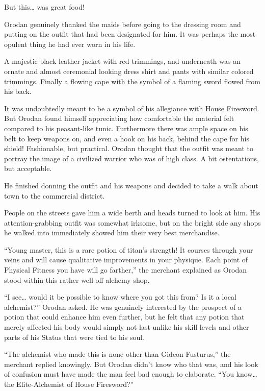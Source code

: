 \documentclass[a4paper,10pt]{book}
\begin{document}
But this… was great food!\par
Orodan genuinely thanked the maids before going to the dressing room and putting on the outfit that had been designated for him. It was perhaps the most opulent thing he had ever worn in his life.\par
A majestic black leather jacket with red trimmings, and underneath was an ornate and almost ceremonial looking dress shirt and pants with similar colored trimmings. Finally a flowing cape with the symbol of a flaming sword flowed from his back.\par
It was undoubtedly meant to be a symbol of his allegiance with House Firesword. But Orodan found himself appreciating how comfortable the material felt compared to his peasant-like tunic. Furthermore there was ample space on his belt to keep weapons on, and even a hook on his back, behind the cape for his shield! Fashionable, but practical. Orodan thought that the outfit was meant to portray the image of a civilized warrior who was of high class. A bit ostentatious, but acceptable.\par
He finished donning the outfit and his weapons and decided to take a walk about town to the commercial district.\par
People on the streets gave him a wide berth and heads turned to look at him. His attention-grabbing outfit was somewhat irksome, but on the bright side any shops he walked into immediately showed him their very best merchandise.\par
“Young master, this is a rare potion of titan’s strength! It courses through your veins and will cause qualitative improvements in your physique. Each point of Physical Fitness you have will go farther,” the merchant explained as Orodan stood within this rather well-off alchemy shop.\par
“I see… would it be possible to know where you got this from? Is it a local alchemist?” Orodan asked. He was genuinely interested by the prospect of a potion that could enhance him even further, but he felt that any potion that merely affected his body would simply not last unlike his skill levels and other parts of his Status that were tied to his soul.\par
“The alchemist who made this is none other than Gideon Fusturus,” the merchant replied knowingly. But Orodan didn’t know who that was, and his look of confusion must have made the man feel bad enough to elaborate. “You know… the Elite-Alchemist of House Firesword?”\par
\end{document}
